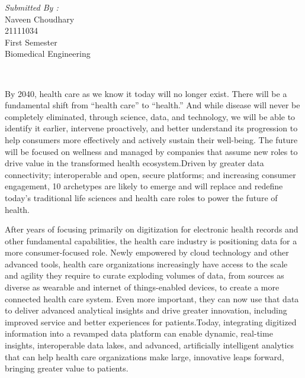 \documentclass[12pt]{article}
\begin{document}
\begin{titlepage}
\begin{minipage}{0.4\textwidth}
			\begin{flushright} \large
			\emph{Submitted By :} \\
			Naveen Choudhary\\
            21111034\\
        First Semester\\
        Biomedical Engineering\\
		\end{flushright}
        
	\end{minipage}\\[2 cm]
	
\end{titlepage}

By 2040, health care as we know it today will no longer exist. There will be a fundamental shift from “health care” to “health.” And while disease will never be completely eliminated, through science, data, and technology, we will be able to identify it earlier, intervene proactively, and better understand its progression to help consumers more effectively and actively sustain their well-being. The future will be focused on wellness and managed by companies that assume new roles to drive value in the transformed health ecosystem.Driven by greater data connectivity; interoperable and open, secure platforms; and increasing consumer engagement, 10 archetypes are likely to emerge and will replace and redefine today’s traditional life sciences and health care roles to power the future of health. 

\indent

After years of focusing primarily on digitization for electronic health records and other fundamental capabilities, the health care industry is positioning data for a more consumer-focused role. Newly empowered by cloud technology and other advanced tools, health care organizations increasingly have access to the scale and agility they require to curate exploding volumes of data, from sources as diverse as wearable and internet of things-enabled devices, to create a more connected health care system. Even more important, they can now use that data to deliver advanced analytical insights and drive greater innovation, including improved service and better experiences for patients.Today, integrating digitized information into a revamped data platform can enable dynamic, real-time insights, interoperable data lakes, and advanced, artificially intelligent analytics that can help health care organizations make large, innovative leaps forward, bringing greater value to patients.
\end{document}
